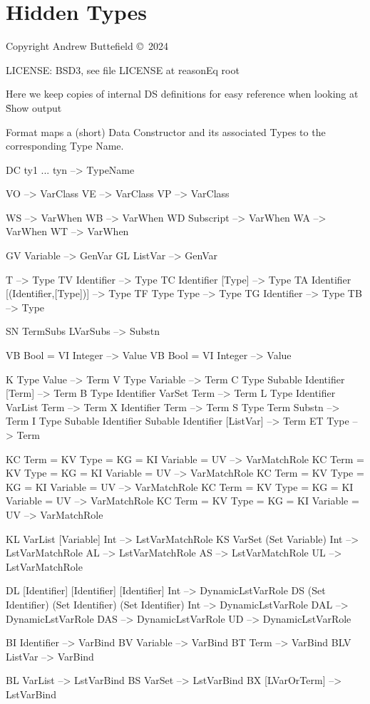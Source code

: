 \chapter{Hidden Types}

Copyright  Andrew Buttefield \copyright\ 2024

LICENSE: BSD3, see file LICENSE at reasonEq root


Here we keep copies of internal DS definitions
for easy reference when looking at \h{Show} output

Format maps a (short) Data Constructor and its associated Types to the corresponding Type Name.

\begin{code}
DC ty1 ... tyn -->  TypeName
\end{code}


\begin{code}
VO  -->  VarClass
VE  -->  VarClass
VP   -->  VarClass

WS  -->  VarWhen
WB  -->  VarWhen
WD Subscript  -->  VarWhen
WA  -->  VarWhen
WT   -->  VarWhen

GV Variable -->  GenVar
GL ListVar   -->  GenVar

T  -->  Type
TV Identifier  -->  Type
TC Identifier [Type]  -->  Type
TA Identifier [(Identifier,[Type])]  -->  Type
TF Type Type  -->  Type
TG Identifier -->  Type
TB   -->  Type

SN TermSubs LVarSubs   -->  Substn

VB Bool = VI Integer   -->  Value
VB Bool = VI Integer   -->  Value

K Type Value  -->  Term
V Type Variable  -->  Term
C Type Subable Identifier [Term]  -->  Term
B Type Identifier VarSet Term  -->  Term
L Type Identifier VarList Term  -->  Term
X Identifier Term  -->  Term
S Type Term Substn -->  Term
I Type Subable Identifier Subable Identifier [ListVar]  -->  Term
ET Type   -->  Term

KC Term = KV Type = KG = KI Variable = UV   -->  VarMatchRole
KC Term = KV Type = KG = KI Variable = UV   -->  VarMatchRole
KC Term = KV Type = KG = KI Variable = UV   -->  VarMatchRole
KC Term = KV Type = KG = KI Variable = UV   -->  VarMatchRole
KC Term = KV Type = KG = KI Variable = UV   -->  VarMatchRole

KL VarList [Variable] Int  -->  LstVarMatchRole
KS VarSet (Set Variable) Int  -->  LstVarMatchRole
AL  -->  LstVarMatchRole
AS  -->  LstVarMatchRole
UL   -->  LstVarMatchRole

DL [Identifier] [Identifier] [Identifier] Int  -->  DynamicLstVarRole
DS (Set Identifier) (Set Identifier) (Set Identifier) Int --> DynamicLstVarRole
DAL  -->  DynamicLstVarRole
DAS  -->  DynamicLstVarRole
UD   -->  DynamicLstVarRole

BI Identifier  -->  VarBind
BV Variable   -->  VarBind
BT Term  -->  VarBind
BLV ListVar   -->  VarBind


BL  VarList  -->  LstVarBind
BS  VarSet  -->  LstVarBind
BX  [LVarOrTerm]   -->  LstVarBind
\end{code}
